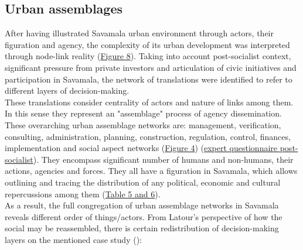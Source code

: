 \documentclass[11pt]{report}
\begin{document}
\subsection{Urban assemblages}

After having illustrated Savamala urban environment through actors, their figuration and agency, the complexity of its urban development was interpreted through node-link reality (\href{}{Figure 8}).
Taking into account post-socialist context, significant pressure from private investors and articulation of civic initiatives and participation in Savamala, the network of translations were identified to refer to different layers of decision-making.
\\

These translations consider centrality of actors and nature of links among them. In this sense they represent an "assemblage" process of agency dissemination.
These overarching urban assemblage networks are: management, verification, consulting, administration, planning, construction, regulation, control, finances, implementation and social aspect networks (\href{}{Figure 4}) (\href{}{expert questionnaire post-socialist}).
They encompass significant number of humans and non-humans, their actions, agencies and forces. 
They all have a figuration in Savamala, which allows outlining and tracing the distribution of any political, economic and cultural repercussions among them (\href{}{Table 5 and 6}).
\\ 

As a result, the full congregation of urban assemblage networks in Savamala reveals different order of things/actors. From Latour's perspective of how the social may be reassembled, there is certain redistribution of decision-making layers on the mentioned case study (\cite{Latour 2005}):
\end{document}
